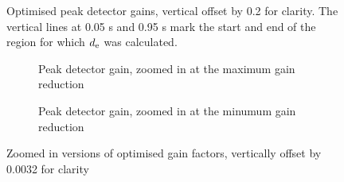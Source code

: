 \documentclass[../main2.tex]{subfiles}
\providecommand{\rootdir}{..}
\begin{document}
\begin{figure}[h]
\centerline{}
\caption{Optimised peak detector gains, vertical offset by 0.2 for clarity. The vertical lines at 0.05 s and 0.95 s mark the start and end of the region for which $d_\text{e}$ was calculated.}
\label{fig:peak_det_opt_gain}
\end{figure}
\begin{figure}

\captionsetup{justification=centering}
\begin{subfigure}{\linewidth}
\centering
\centerline{}
\caption{Peak detector gain, zoomed in at the maximum gain reduction}
\end{subfigure}

\par\bigskip

\captionsetup{justification=centering}
\begin{subfigure}{\linewidth}
\centering
\centerline{}
\caption{Peak detector gain, zoomed in at the minumum gain reduction}
\end{subfigure}

\caption{Zoomed in versions of optimised gain factors, vertically offset by 0.0032 for clarity}
\label{fig:peak_det_opt_gain_zoom}
\end{figure}
\end{document}
